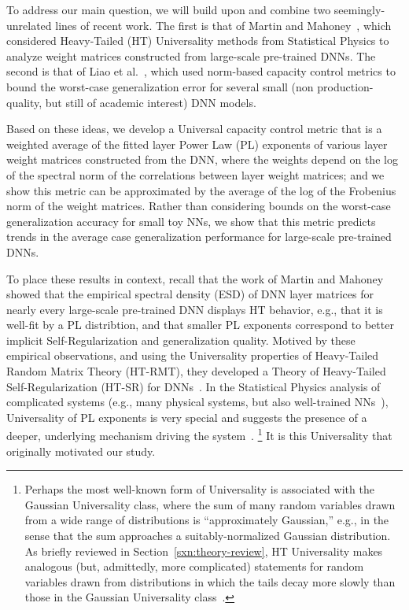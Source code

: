 To address our main question, we will build upon and combine two seemingly-unrelated lines of recent work.
The first is that of Martin and Mahoney~\cite{MM17_TR,MM18_TR}, which considered Heavy-Tailed (HT) Universality methods from Statistical Physics to analyze weight matrices constructed from large-scale pre-trained DNNs.
The second is that of Liao et al.~\cite{LMBx18_TR}, which used norm-based capacity control metrics to bound the worst-case generalization error for several small (non production-quality, but still of academic interest) DNN models.

Based on these ideas, we develop a Universal capacity control metric that is a weighted average of the fitted layer Power Law (PL) exponents of various layer weight matrices constructed from the DNN, where the weights depend on the log of the spectral norm of the correlations between layer weight matrices; and we show this metric can be approximated by the average of the log of the Frobenius norm of the weight matrices.
Rather than considering bounds on the worst-case generalization accuracy for small toy NNs, we show that this metric predicts trends in the average case generalization performance for large-scale pre-trained DNNs.

To place these results in context, recall that the work of Martin and Mahoney~\cite{MM18_TR} showed that the empirical spectral density (ESD) of DNN layer matrices for nearly every large-scale pre-trained DNN displays HT behavior, e.g., that it is well-fit by a PL distribtion, and that smaller PL exponents correspond to better implicit Self-Regularization and generalization quality.
Motived by these empirical observations, and using the Universality properties of Heavy-Tailed Random Matrix Theory (HT-RMT), they developed a Theory of Heavy-Tailed Self-Regularization (HT-SR) for DNNs~\cite{MM17_TR,MM18_TR}.
In the Statistical Physics analysis of complicated systems (e.g., many physical systems, but also well-trained NNs~\cite{EB01_BOOK,nishimori01}), Universality of PL exponents is very special and suggests the presence of a deeper, underlying mechanism driving the system~\cite{SornetteBook,BouchaudPotters03}.%
\footnote{Perhaps the most well-known form of Universality is associated with the Gaussian Universality class, where the sum of many random variables drawn from a wide range of distributions is ``approximately Gaussian,'' e.g., in the sense that the sum approaches a suitably-normalized Gaussian distribution.  As briefly reviewed in Section~\ref{sxn:theory-review}, HT Universality makes analogous (but, admittedly, more complicated) statements for random variables drawn from distributions in which the tails decay more slowly than those in the Gaussian Universality class~\cite{MM18_TR}.}
It is this Universality that originally motivated our study.

